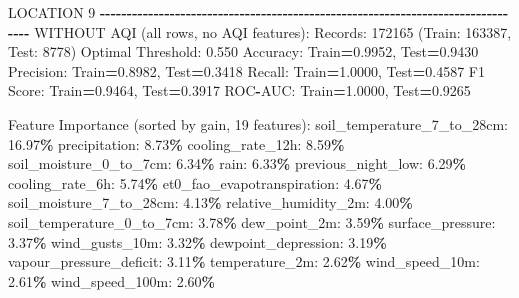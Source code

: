 \documentclass[
  letterpaper,
  DIV=11,
  numbers=noendperiod]{scrartcl}
\newenvironment{Shaded}{\begin{snugshade}}{\end{snugshade}}
\newcommand{\BuiltInTok}[1]{#1}
\newcommand{\DecValTok}[1]{\textcolor[rgb]{0.00,0.00,0.81}{#1}}
\newcommand{\FloatTok}[1]{\textcolor[rgb]{0.00,0.00,0.81}{#1}}
\newcommand{\NormalTok}[1]{#1}
\newcommand{\OperatorTok}[1]{\textcolor[rgb]{0.81,0.36,0.00}{\textbf{#1}}}
\begin{document}
\begin{Shaded}
\begin{Highlighting}[]
\NormalTok{LOCATION }\DecValTok{9}
\OperatorTok{{-}{-}{-}{-}{-}{-}{-}{-}{-}{-}{-}{-}{-}{-}{-}{-}{-}{-}{-}{-}{-}{-}{-}{-}{-}{-}{-}{-}{-}{-}{-}{-}{-}{-}{-}{-}{-}{-}{-}{-}{-}{-}{-}{-}{-}{-}{-}{-}{-}{-}{-}{-}{-}{-}{-}{-}{-}{-}{-}{-}{-}{-}{-}{-}{-}{-}{-}{-}{-}{-}{-}{-}{-}{-}{-}{-}{-}{-}{-}{-}}
\NormalTok{WITHOUT AQI (}\BuiltInTok{all}\NormalTok{ rows, no AQI features):}
\NormalTok{  Records: }\DecValTok{172165}\NormalTok{ (Train: }\DecValTok{163387}\NormalTok{, Test: }\DecValTok{8778}\NormalTok{)}
\NormalTok{  Optimal Threshold: }\FloatTok{0.550}
\NormalTok{  Accuracy: Train}\OperatorTok{=}\FloatTok{0.9952}\NormalTok{, Test}\OperatorTok{=}\FloatTok{0.9430}
\NormalTok{  Precision: Train}\OperatorTok{=}\FloatTok{0.8982}\NormalTok{, Test}\OperatorTok{=}\FloatTok{0.3418}
\NormalTok{  Recall: Train}\OperatorTok{=}\FloatTok{1.0000}\NormalTok{, Test}\OperatorTok{=}\FloatTok{0.4587}
\NormalTok{  F1 Score: Train}\OperatorTok{=}\FloatTok{0.9464}\NormalTok{, Test}\OperatorTok{=}\FloatTok{0.3917}
\NormalTok{  ROC}\OperatorTok{{-}}\NormalTok{AUC: Train}\OperatorTok{=}\FloatTok{1.0000}\NormalTok{, Test}\OperatorTok{=}\FloatTok{0.9265}

\NormalTok{  Feature Importance (}\BuiltInTok{sorted}\NormalTok{ by gain, }\DecValTok{19}\NormalTok{ features):}
\NormalTok{    soil\_temperature\_7\_to\_28cm: }\FloatTok{16.97}\OperatorTok{\%}
\NormalTok{    precipitation: }\FloatTok{8.73}\OperatorTok{\%}
\NormalTok{    cooling\_rate\_12h: }\FloatTok{8.59}\OperatorTok{\%}
\NormalTok{    soil\_moisture\_0\_to\_7cm: }\FloatTok{6.34}\OperatorTok{\%}
\NormalTok{    rain: }\FloatTok{6.33}\OperatorTok{\%}
\NormalTok{    previous\_night\_low: }\FloatTok{6.29}\OperatorTok{\%}
\NormalTok{    cooling\_rate\_6h: }\FloatTok{5.74}\OperatorTok{\%}
\NormalTok{    et0\_fao\_evapotranspiration: }\FloatTok{4.67}\OperatorTok{\%}
\NormalTok{    soil\_moisture\_7\_to\_28cm: }\FloatTok{4.13}\OperatorTok{\%}
\NormalTok{    relative\_humidity\_2m: }\FloatTok{4.00}\OperatorTok{\%}
\NormalTok{    soil\_temperature\_0\_to\_7cm: }\FloatTok{3.78}\OperatorTok{\%}
\NormalTok{    dew\_point\_2m: }\FloatTok{3.59}\OperatorTok{\%}
\NormalTok{    surface\_pressure: }\FloatTok{3.37}\OperatorTok{\%}
\NormalTok{    wind\_gusts\_10m: }\FloatTok{3.32}\OperatorTok{\%}
\NormalTok{    dewpoint\_depression: }\FloatTok{3.19}\OperatorTok{\%}
\NormalTok{    vapour\_pressure\_deficit: }\FloatTok{3.11}\OperatorTok{\%}
\NormalTok{    temperature\_2m: }\FloatTok{2.62}\OperatorTok{\%}
\NormalTok{    wind\_speed\_10m: }\FloatTok{2.61}\OperatorTok{\%}
\NormalTok{    wind\_speed\_100m: }\FloatTok{2.60}\OperatorTok{\%}


\end{Highlighting}
\end{Shaded}
\end{document}
